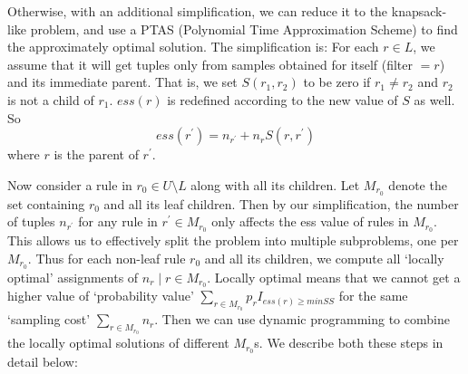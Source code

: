 Otherwise, with an additional simplification, we can reduce it to the knapsack-like problem, and use a PTAS (Polynomial Time Approximation Scheme) to find the approximately optimal solution. The simplification is: For each $r \in L$, we assume that it will get tuples only from samples obtained for itself (filter $= r$) and its immediate parent. That is, we set $S(r_1, r_2)$ to be zero if $r_1 \neq r_2$ and $r_2$ is not a child of $r_1$. $ess(r)$ is redefined according to the new value of $S$ as well. So $$ess(r^{\prime}) = n_{r^{\prime}} + n_rS(r, r^{\prime})$$ where $r$ is the parent of $r^{\prime}$. 

Now consider a rule in $r_0 \in U \setminus L$ along with all its children. Let $M_{r_0}$ denote the set containing $r_0$ and all its leaf children. Then by our simplification, the number of tuples $n_{r^{\prime}}$ for any rule in $r^{\prime} \in M_{r_0}$ only affects the ess value of rules in $M_{r_0}$. This allows us to effectively split the problem into multiple subproblems, one per $M_{r_0}$. Thus for each non-leaf rule $r_0$ and all its children, we compute all `locally optimal' assignments of $n_r \mid r \in M_{r_0}$. Locally optimal means that we cannot get a higher value of `probability value' $\sum_{r \in M_{r_0}} p_rI_{ess(r) \geq minSS}$ for the same `sampling cost' $\sum_{r\in M_{r_0}} n_r$. Then we can use dynamic programming to combine the locally optimal solutions of different $M_{r_0}$s. We describe both these steps in detail below:

